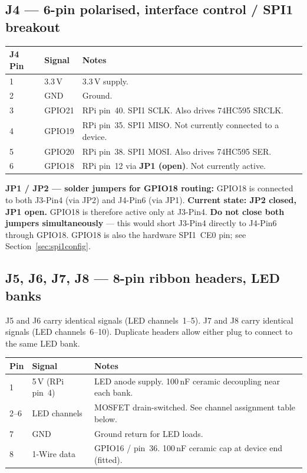\documentclass[11pt,a4paper]{article}
\begin{document}
\subsection{J4 --- 6-pin polarised, interface control / SPI1 breakout}

\begin{tabular}{C{1.4cm} C{2.2cm} L{9cm}}
  \toprule
  \color{white}\textbf{J4 Pin} &
  \color{white}\textbf{Signal} &
  \color{white}\textbf{Notes} \\
   & 3.3\,V  & 3.3\,V supply. \\
  2 & GND     & Ground. \\
  3 & GPIO21  & RPi pin~40. SPI1 SCLK. Also drives 74HC595 SRCLK. \\
  4 & GPIO19  & RPi pin~35. SPI1 MISO. Not currently connected to a device. \\
  5 & GPIO20  & RPi pin~38. SPI1 MOSI. Also drives 74HC595 SER. \\
  6 & GPIO18  & RPi pin~12 via \textbf{JP1 (open)}. Not currently active. \\
  \bottomrule
\end{tabular}

\begin{notebox}
\textbf{JP1 / JP2 --- solder jumpers for GPIO18 routing:}
GPIO18 is connected to both J3-Pin4 (via JP2) and J4-Pin6 (via JP1).
\textbf{Current state: JP2 closed, JP1 open.}
GPIO18 is therefore active only at J3-Pin4.
\textbf{Do not close both jumpers simultaneously} --- this would short
J3-Pin4 directly to J4-Pin6 through GPIO18.
GPIO18 is also the hardware SPI1~CE0 pin; see Section~\ref{sec:spi1config}.
\end{notebox}

\subsection{J5, J6, J7, J8 --- 8-pin ribbon headers, LED banks}

J5 and J6 carry identical signals (LED channels~1--5).
J7 and J8 carry identical signals (LED channels~6--10).
Duplicate headers allow either plug to connect to the same LED bank.

\begin{tabular}{C{1.4cm} C{2.8cm} L{8.5cm}}
  \toprule
  \color{white}\textbf{Pin} &
  \color{white}\textbf{Signal} &
  \color{white}\textbf{Notes} \\
   & 5\,V (RPi pin~4) & LED anode supply. 100\,nF ceramic decoupling near each bank. \\
  2--6 & LED channels   & MOSFET drain-switched.  See channel assignment table below. \\
  7 & GND              & Ground return for LED loads. \\
  8 & 1-Wire data      & GPIO16 / pin~36. 100\,nF ceramic cap at device end (fitted). \\
  \bottomrule
\end{tabular}
\end{document}
